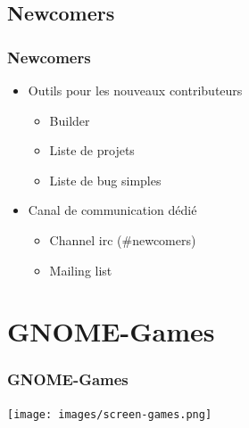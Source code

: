 \documentclass{beamer}
\begin{document}
\begin{frame}
\end{frame}

\subsection{Newcomers}
\begin{frame}
  \frametitle{Newcomers}
  \begin{itemize}
  \item Outils pour les nouveaux contributeurs \pause
    \begin{itemize}
    \item Builder
    \item Liste de projets
    \item Liste de bug simples \pause
    \end{itemize}
  \item Canal de communication dédié \pause
    \begin{itemize}
    \item Channel irc (\#newcomers)
    \item Mailing list
    \end{itemize}
  \end{itemize}
\end{frame}

\section{GNOME-Games}
\begin{frame}
  \frametitle{GNOME-Games}
  \texttt{[image: images/screen-games.png]}
\end{frame}
\end{document}
